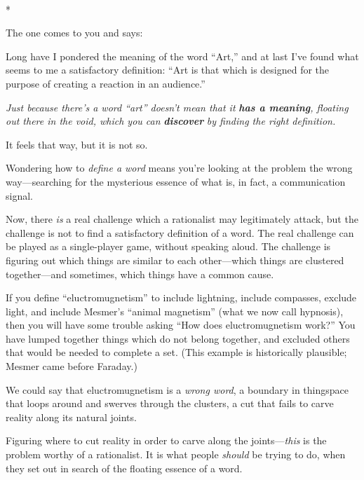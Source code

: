 {\centering
 \ ~
\par}

{\centering
 *
\par}


{
 The one comes to you and says:}

{
 Long have I pondered the meaning of the word
``Art,'' and at last
I've found what seems to me a satisfactory definition:
``Art is that which is designed for the purpose of
creating a reaction in an audience.''}

{
 \textit{Just because there's a word
``art'' doesn't mean
that it }\textbf{\textit{has a meaning}}\textit{, floating out there in
the void, which you can }\textbf{\textit{discover}}\textit{ by finding
the right definition.}}

{
 It feels that way, but it is not so.}

{
 Wondering how to \textit{define a word} means
you're looking at the problem the wrong way---searching
for the mysterious essence of what is, in fact, a communication
signal.}

{
 Now, there \textit{is} a real challenge which a rationalist may
legitimately attack, but the challenge is not to find a satisfactory
definition of a word. The real challenge can be played as a
single-player game, without speaking aloud. The challenge is figuring
out which things are similar to each other---which things are clustered
together---and sometimes, which things have a common cause.}

{
 If you define
``eluctromugnetism'' to include
lightning, include compasses, exclude light, and include
Mesmer's ``animal
magnetism'' (what we now call hypnosis), then you
will have some trouble asking ``How does
eluctromugnetism work?'' You have lumped together
things which do not belong together, and excluded others that would be
needed to complete a set. (This example is historically plausible;
Mesmer came before Faraday.)}

{
 We could say that eluctromugnetism is a \textit{wrong word}, a
boundary in thingspace that loops around and swerves through the
clusters, a cut that fails to carve reality along its natural joints.}

{
 Figuring where to cut reality in order to carve along the
joints---\textit{this} is the problem worthy of a rationalist. It is
what people \textit{should} be trying to do, when they set out in
search of the floating essence of a word.}

